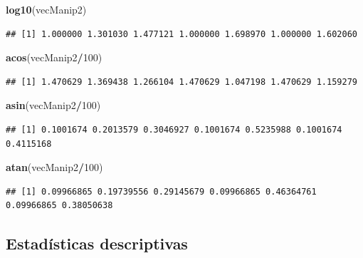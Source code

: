 \documentclass[
]{book}
\newenvironment{Shaded}{\begin{snugshade}}{\end{snugshade}}
\newcommand{\DecValTok}[1]{\textcolor[rgb]{0.00,0.00,0.81}{#1}}
\newcommand{\KeywordTok}[1]{\textcolor[rgb]{0.13,0.29,0.53}{\textbf{#1}}}
\newcommand{\NormalTok}[1]{#1}
\newcommand{\OperatorTok}[1]{\textcolor[rgb]{0.81,0.36,0.00}{\textbf{#1}}}
\begin{document}
\begin{Shaded}
\begin{Highlighting}[]
\KeywordTok{log10}\NormalTok{(vecManip2)}
\end{Highlighting}
\end{Shaded}

\begin{verbatim}
## [1] 1.000000 1.301030 1.477121 1.000000 1.698970 1.000000 1.602060
\end{verbatim}

\begin{Shaded}
\begin{Highlighting}[]
\KeywordTok{acos}\NormalTok{(vecManip2}\OperatorTok{/}\DecValTok{100}\NormalTok{)}
\end{Highlighting}
\end{Shaded}

\begin{verbatim}
## [1] 1.470629 1.369438 1.266104 1.470629 1.047198 1.470629 1.159279
\end{verbatim}

\begin{Shaded}
\begin{Highlighting}[]
\KeywordTok{asin}\NormalTok{(vecManip2}\OperatorTok{/}\DecValTok{100}\NormalTok{)}
\end{Highlighting}
\end{Shaded}

\begin{verbatim}
## [1] 0.1001674 0.2013579 0.3046927 0.1001674 0.5235988 0.1001674 0.4115168
\end{verbatim}

\begin{Shaded}
\begin{Highlighting}[]
\KeywordTok{atan}\NormalTok{(vecManip2}\OperatorTok{/}\DecValTok{100}\NormalTok{)}
\end{Highlighting}
\end{Shaded}

\begin{verbatim}
## [1] 0.09966865 0.19739556 0.29145679 0.09966865 0.46364761 0.09966865 0.38050638
\end{verbatim}

\hypertarget{estaduxedsticas-descriptivas}{%
\subsection{Estadísticas descriptivas}\label{estaduxedsticas-descriptivas}}
\end{document}
